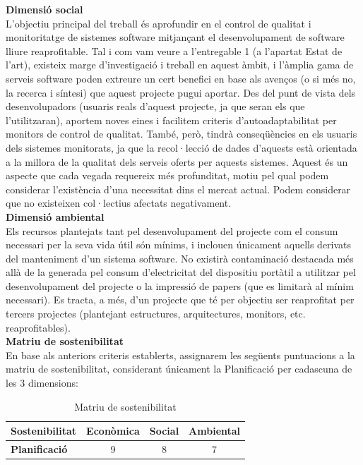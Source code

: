 \noindent \textbf{\large Dimensió social}\\

\noindent L’objectiu principal del treball és aprofundir en el control de qualitat i monitoritatge de sistemes software mitjançant el desenvolupament de software lliure reaprofitable. Tal i com vam veure a l’entregable 1 (a l’apartat Estat de l’art), existeix marge d’investigació i treball en aquest àmbit, i l’àmplia gama de serveis software poden extreure un cert benefici en base als avenços (o si més no, la recerca i síntesi) que aquest projecte pugui aportar. Des del punt de vista dels desenvolupadors (usuaris reals d’aquest projecte, ja que seran els que l’utilitzaran), aportem noves eines i facilitem criteris d’autoadaptabilitat per monitors de control de qualitat. També, però, tindrà conseqüències en els usuaris dels sistemes monitorats, ja que la recol·lecció de dades d’aquests està orientada a la millora de la qualitat dels serveis oferts per aquests sistemes. Aquest és un aspecte que cada vegada requereix més profunditat, motiu pel qual podem considerar l’existència d’una necessitat dins el mercat actual. Podem considerar que no existeixen col·lectius afectats negativament.\\

\noindent \textbf{\large Dimensió ambiental}\\

\noindent Els recursos plantejats tant pel desenvolupament del projecte com el consum necessari per la seva vida útil són mínims, i inclouen únicament aquells derivats del manteniment d’un sistema software. No existirà contaminació destacada més allà de la generada pel consum d’electricitat del dispositiu portàtil a utilitzar pel desenvolupament del projecte o la impressió de papers (que es limitarà al mínim necessari). Es tracta, a més, d’un projecte que té per objectiu ser reaprofitat per tercers projectes (plantejant estructures, arquitectures, monitors, etc. reaprofitables).\\

\noindent \textbf{\large Matriu de sostenibilitat}\\

\noindent En base als anteriors criteris establerts, assignarem les següents puntuacions a la matriu de sostenibilitat, considerant únicament la Planificació per cadascuna de les 3 dimensions:

\begin{table}[htb]
\centering
\label{MatriuSostenibilitat}
\begin{tabular}{lccc}
\hline \textbf{Sostenibilitat}                           &  \textbf{Econòmica} & \textbf{Social}                           &  \textbf{Ambiental} \\
\hline
\textbf{Planificació} & 9 & 8 & 7 \\
\hline            
\end{tabular}%
\caption{Matriu de sostenibilitat}
\end{table}

